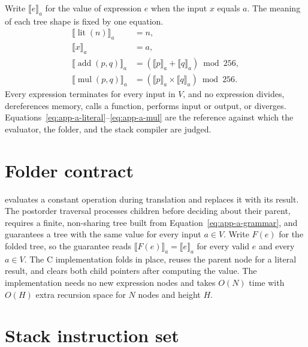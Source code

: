 Write $\llbracket e\rrbracket_a$ for the value of expression $e$ when the input $x$ equals $a$.
The meaning of each tree shape is fixed by one equation.
\begin{align}
  \llbracket\operatorname{lit}(n)\rrbracket_a &= n, \label{eq:app-a-literal}\\
  \llbracket x\rrbracket_a &= a, \label{eq:app-a-input}\\
  \llbracket\operatorname{add}(p,q)\rrbracket_a
    &= (\llbracket p\rrbracket_a+\llbracket q\rrbracket_a)\bmod256,
       \label{eq:app-a-add}\\
  \llbracket\operatorname{mul}(p,q)\rrbracket_a
    &= (\llbracket p\rrbracket_a\times\llbracket q\rrbracket_a)\bmod256.
       \label{eq:app-a-mul}
\end{align}
Every expression terminates for every input in $V$, and no expression divides, dereferences memory, calls a function, performs input or output, or diverges.
Equations~\ref{eq:app-a-literal}--\ref{eq:app-a-mul} are the reference against which the evaluator, the folder, and the stack compiler are judged.

\section{Folder contract}
\label{sec:app-a-folder-contract}

 evaluates a constant operation during translation and replaces it with its result.
The postorder traversal processes children before deciding about their parent, requires a finite, non-sharing tree built from Equation~\ref{eq:app-a-grammar}, and guarantees a tree with the same value for every input $a\in V$.
Write $F(e)$ for the folded tree, so the guarantee reads $\llbracket F(e)\rrbracket_a=\llbracket e\rrbracket_a$ for every valid $e$ and every $a\in V$.
The C implementation folds in place, reuses the parent node for a literal result, and clears both child pointers after computing the value.
The implementation needs no new expression nodes and takes $O(N)$ time with $O(H)$ extra recursion space for $N$ nodes and height $H$.

\section{Stack instruction set}
\label{sec:app-a-opcodes}

